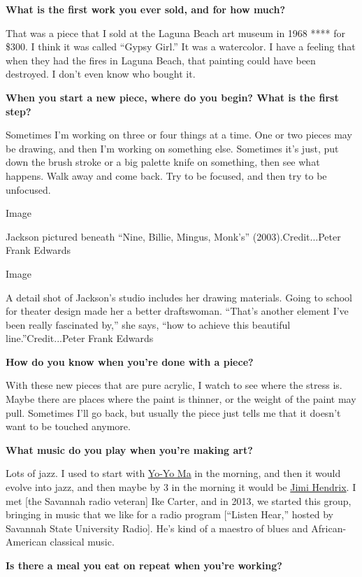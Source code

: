 \textbf{What is the first work you ever sold, and for how much?}

That was a piece that I sold at the Laguna Beach art museum in 1968 ****
for \$300. I think it was called ``Gypsy Girl.'' It was a watercolor. I
have a feeling that when they had the fires in Laguna Beach, that
painting could have been destroyed. I don't even know who bought it.

\textbf{When you start a new piece, where do you begin? What is the
first step?}

Sometimes I'm working on three or four things at a time. One or two
pieces may be drawing, and then I'm working on something else. Sometimes
it's just, put down the brush stroke or a big palette knife on
something, then see what happens. Walk away and come back. Try to be
focused, and then try to be unfocused.

Image

Jackson pictured beneath ``Nine, Billie, Mingus, Monk's''
(2003).Credit...Peter Frank Edwards

Image

A detail shot of Jackson's studio includes her drawing materials. Going
to school for theater design made her a better draftswoman. ``That's
another element I've been really fascinated by,'' she says, ``how to
achieve this beautiful line.''Credit...Peter Frank Edwards

\textbf{How do you know when you're done with a piece?}

With these new pieces that are pure acrylic, I watch to see where the
stress is. Maybe there are places where the paint is thinner, or the
weight of the paint may pull. Sometimes I'll go back, but usually the
piece just tells me that it doesn't want to be touched anymore.

\textbf{What music do you play when you're making art?}

Lots of jazz. I used to start with
\href{https://www.nytimes3xbfgragh.onion/topic/person/yoyo-ma}{Yo-Yo Ma}
in the morning, and then it would evolve into jazz, and then maybe by 3
in the morning it would be
\href{https://www.nytimes3xbfgragh.onion/topic/person/jimi-hendrix}{Jimi
Hendrix}. I met {[}the Savannah radio veteran{]} Ike Carter, and in
2013, we started this group, bringing in music that we like for a radio
program {[}``Listen Hear,'' hosted by Savannah State University
Radio{]}. He's kind of a maestro of blues and African-American classical
music.

\textbf{Is there a meal you eat on repeat when you're working?}

